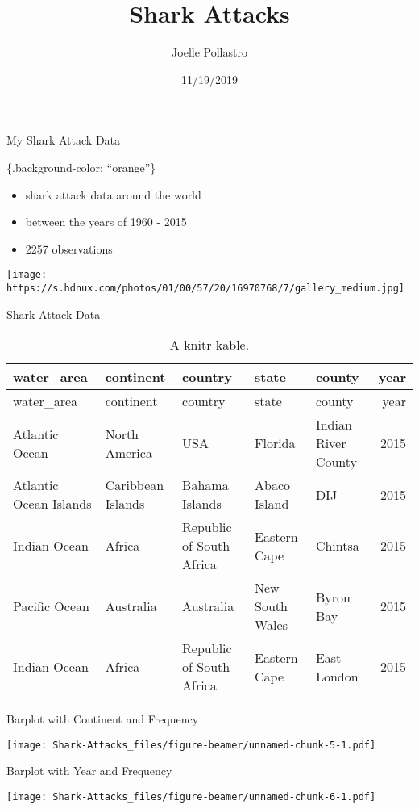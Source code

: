 \documentclass[ignorenonframetext,]{beamer}
\title{Shark Attacks}
\author{Joelle Pollastro}
\date{11/19/2019}
\providecommand{\tightlist}{%
  \setlength{\itemsep}{0pt}\setlength{\parskip}{0pt}}
\begin{document}
\frame{\titlepage}

\begin{frame}{My Shark Attack Data}
\protect\hypertarget{my-shark-attack-data}{}

\{.background-color: ``orange''\}

\begin{itemize}
\tightlist
\item
  shark attack data around the world
\item
  between the years of 1960 - 2015
\item
  2257 observations
\end{itemize}

\texttt{[image: https://s.hdnux.com/photos/01/00/57/20/16970768/7/gallery\_medium.jpg]}

\end{frame}

\begin{frame}{Shark Attack Data}
\protect\hypertarget{shark-attack-data}{}

\begin{longtable}[]{@{}lllllr@{}}
\caption{A knitr kable.}\tabularnewline
\toprule
water\_area & continent & country & state & county & year\tabularnewline
\midrule
\endfirsthead
\toprule
water\_area & continent & country & state & county & year\tabularnewline
\midrule
\endhead
Atlantic Ocean & North America & USA & Florida & Indian River County &
2015\tabularnewline
Atlantic Ocean Islands & Caribbean Islands & Bahama Islands & Abaco
Island & DIJ & 2015\tabularnewline
Indian Ocean & Africa & Republic of South Africa & Eastern Cape &
Chintsa & 2015\tabularnewline
Pacific Ocean & Australia & Australia & New South Wales & Byron Bay &
2015\tabularnewline
Indian Ocean & Africa & Republic of South Africa & Eastern Cape & East
London & 2015\tabularnewline
\bottomrule
\end{longtable}

\end{frame}

\begin{frame}{Barplot with Continent and Frequency}
\protect\hypertarget{barplot-with-continent-and-frequency}{}

\texttt{[image: Shark-Attacks\_files/figure-beamer/unnamed-chunk-5-1.pdf]}

\end{frame}

\begin{frame}{Barplot with Year and Frequency}
\protect\hypertarget{barplot-with-year-and-frequency}{}

\texttt{[image: Shark-Attacks\_files/figure-beamer/unnamed-chunk-6-1.pdf]}

\end{frame}
\end{document}
